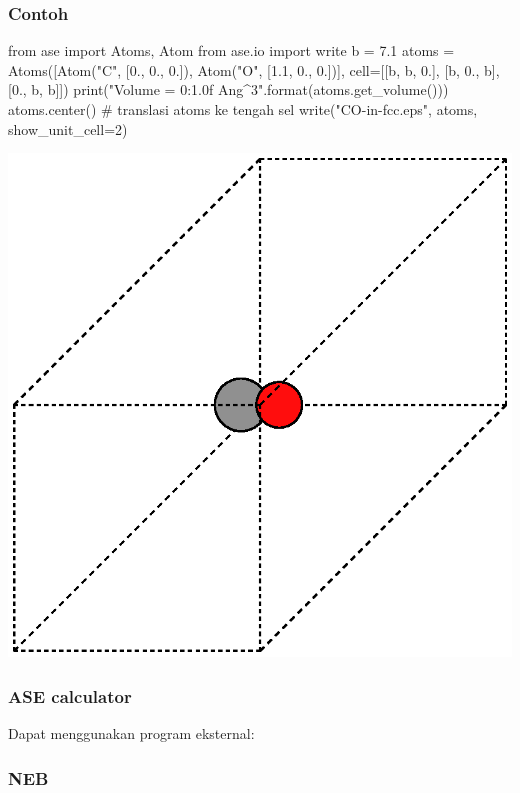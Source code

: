 \documentclass[bahasa,10pt]{beamer}
\begin{document}
\begin{frame}[fragile]
\frametitle{Contoh}

\begin{pythoncode}
from ase import Atoms, Atom
from ase.io import write
b = 7.1
atoms = Atoms([Atom("C", [0., 0., 0.]),
               Atom("O", [1.1, 0., 0.])],
               cell=[[b, b, 0.],
                     [b, 0., b],
                     [0., b, b]])
print("Volume = {0:1.0f} Ang^3".format(atoms.get_volume()))
atoms.center()        # translasi atoms ke tengah sel
write("CO-in-fcc.eps", atoms, show_unit_cell=2)
\end{pythoncode}

{\centering
\includegraphics[scale=0.4]{CO-in-fcc.eps}
\par}

\end{frame}


\begin{frame}
\frametitle{ASE calculator}

Dapat menggunakan program eksternal:

\end{frame}



\begin{frame}
\frametitle{NEB}


\end{frame}
\end{document}
